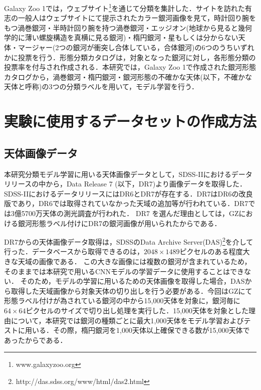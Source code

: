 \documentclass[a4j, 11pt]{jreport}
\begin{document}
Galaxy Zoo 1では，ウェブサイト\footnote{www.galaxyzoo.org}を通じて分類を集計した．サイトを訪れた有志の一般人はウェブサイトにて提示されたカラー銀河画像を見て，時計回り腕をもつ渦巻銀河・半時計回り腕を持つ渦巻銀河・エッジオン(地球から見ると幾何学的に薄い螺旋構造を真横に見る銀河)・楕円銀河・星もしくは分からない天体・マージャー(2つの銀河が衝突し合体している，合体銀河)の6つのうちいずれかに投票を行う．形態分類カタログは，対象となった銀河に対し，各形態分類の投票率を付与され作成される．本研究では，Galaxy Zoo 1で作成された銀河形態カタログから，渦巻銀河・楕円銀河・銀河形態の不確かな天体(以下，不確かな天体と呼称)の3つの分類ラベルを用いて，モデル学習を行う．



\section{実験に使用するデータセットの作成方法}
\subsection{天体画像データ}
本研究分類モデル学習に用いる天体画像データとして，SDSS-IIにおけるデータリリースの中から，Data Release 7 (以下，DR7)\cite{Abazajian2009}より画像データを取得した．SDSS-IIにおけるデータリリースにはDR6とDR7が存在する．DR7はDR6の改良版であり，DR6では取得されていなかった天域の追加等が行われている．DR7では3億5700万天体の測光調査が行われた．
DR7 を選んだ理由としては，GZにおける銀河形態ラベル付けにDR7の銀河画像が用いられたからである．

DR7からの天体画像データ取得は，SDSSのData Archive Server(DAS)\footnote{http://das.sdss.org/www/html/das2.html}を介して行った．データベースから取得できるのは，$2048\times1489$ピクセルのある程度大きな天域の画像である．
この大きな画像には複数の銀河が含まれているため，そのままでは本研究で用いるCNNモデルの学習データに使用することはできない．
そのため，モデルの学習に用いるための天体画像を取得した場合，DASから取得した天域画像から対象天体の切り出しを行う必要がある．今回はGZにて形態ラベル付けが為されている銀河の中から15,000天体を対象に，銀河毎に$64\times64$ピクセルのサイズで切り出し処理を実行した．15,000天体を対象とした理由について，本研究では銀河の種類ごとに最大1,000天体をモデル学習およびテストに用いる．その際，楕円銀河を1,000天体以上確保できる数が15,000天体であったからである．
\end{document}
